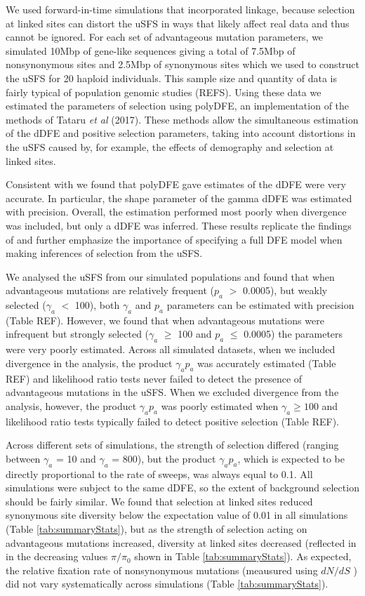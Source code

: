 	We used forward-in-time simulations that incorporated linkage, because selection at linked sites can distort the uSFS in ways that likely affect real data and thus cannot be ignored. For each set of advantageous mutation parameters, we simulated 10Mbp of gene-like sequences giving a total of 7.5Mbp of nonsynonymous sites and 2.5Mbp of synonymous sites which we used to construct the uSFS for 20 haploid individuals. This sample size and quantity of data is fairly typical of population genomic studies (REFS). Using these data we estimated the parameters of selection using polyDFE, an implementation of the methods of Tataru \textit{et al} (2017). These methods allow the simultaneous estimation of the dDFE and positive selection parameters, taking into account distortions in the uSFS caused by, for example, the effects of demography and selection at linked sites. 

	Consistent with \cite{RN354}  we found that polyDFE gave estimates of the dDFE were very accurate. In particular, the shape parameter of the gamma dDFE was estimated with precision. Overall, the estimation performed most poorly when divergence was included, but only a dDFE was inferred. These results replicate the findings of \cite{RN354} and further emphasize the importance of specifying a full DFE model when making inferences of selection from the uSFS. 
	
	 We analysed the uSFS from our simulated populations and found that when advantageous mutations are relatively frequent ($p_a$ $>$ 0.0005), but weakly selected ($\gamma_a$ $<$ 100), both $\gamma_a$ and $p_a$ parameters can be estimated with precision (Table REF). However, we found that when advantageous mutations were infrequent but strongly selected ($\gamma_a$ $\geq$ 100 and $p_a$ $\leq$ 0.0005) the parameters were very poorly estimated. Across all simulated datasets, when we included divergence in the analysis, the product $\gamma_a p_a$ was accurately estimated (Table REF) and likelihood ratio tests never failed to detect the presence of advantageous mutations in the uSFS. When we excluded divergence from the analysis, however, the product  $\gamma_a p_a$  was poorly estimated when $\gamma_a \geq 100$ and likelihood ratio tests typically failed to detect positive selection (Table REF).
	
	Across different sets of simulations, the strength of selection differed (ranging between $\gamma_a$ = 10 and $\gamma_a$ = 800), but the product $\gamma_a p_a$, which is expected to be directly proportional to the rate of sweeps, was always equal to 0.1. All simulations were subject to the same dDFE, so the extent of background selection should be fairly similar. We found that selection at linked sites reduced synonymous site diversity below the expectation value of 0.01 in all simulations (Table \ref{tab:summaryStats}),  but as the strength of selection acting on advantageous mutations increased, diversity at linked sites decreased (reflected in in the decreasing values $\pi/\pi_0$ shown in Table \ref{tab:summaryStats}). As expected, the relative fixation rate of nonsynonymous mutations (meausured using  $dN/dS$ ) did not vary systematically across simulations (Table \ref{tab:summaryStats}).
	
